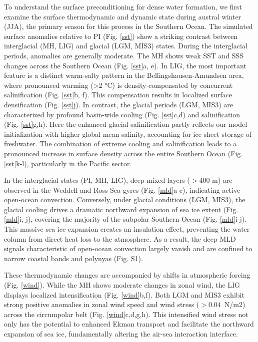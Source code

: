 \documentclass[draft]{agujournal2025}
\begin{document}
To understand the surface preconditioning for dense water formation, we first examine the surface thermodynamic and dynamic state during austral winter (JJA), the primary season for this process in the Southern Ocean. %
The simulated surface anomalies relative to PI (Fig. \ref{sst}) show a striking contrast between interglacial (MH, LIG) and glacial (LGM, MIS3) states. During the interglacial periods, anomalies are generally moderate. The MH shows weak SST and SSS changes across the Southern Ocean (Fig. \ref{sst}a, e). In LIG, the most important feature is a distinct warm-salty pattern in the Bellingshausen-Amundsen area, where pronounced warming (>2 °C) is density-compensated by concurrent salinification (Fig. \ref{sst}b, f). This compensation results in localized surface densification (Fig. \ref{sst}j).
In  contrast, the glacial periods (LGM, MIS3) are characterized by profound basin-wide cooling (Fig. \ref{sst}c,d) and salinification (Fig. \ref{sst}g,h). Here the enhanced glacial salinification partly reflects our model initialization with higher global mean salinity, accounting for ice sheet storage of freshwater. The combination of extreme cooling and salinification leads to a pronounced increase in surface density across the entire Southern Ocean (Fig. \ref{sst}k-l), particularly in the Pacific sector.




In the interglacial states (PI, MH, LIG),  deep mixed layers ($>$400 m) are observed in the Weddell and Ross Sea gyres (Fig. \ref{mld}a-c), indicating active open-ocean convection. Conversely, under glacial conditions (LGM, MIS3), the glacial cooling drives a dramatic northward expansion of sea ice extent (Fig. \ref{mld}i, j), covering the majority of the subpolar Southern Ocean (Fig. \ref{mld}i-j). This massive sea ice expansion creates an insulation effect, preventing the water column from direct heat loss to the atmosphere. As a result, the deep MLD signals characteristic of open-ocean convection largely vanish and are confined to narrow coastal bands and polynyas (Fig. S1). %


These thermodynamic changes are accompanied by shifts in atmospheric forcing (Fig. \ref{wind}). While the MH shows moderate changes in zonal wind, the LIG displays localized intensification (Fig. \ref{wind}b,f). Both LGM and MIS3 exhibit strong positive anomalies in zonal wind speed and wind stress ($>0.04$~N/m$2$) across the circumpolar belt (Fig. \ref{wind}c,d,g,h). This intensified wind stress not only has the potential to enhanced Ekman transport and facilitate the northward expansion of sea ice, fundamentally altering the air-sea interaction interface.
\end{document}
